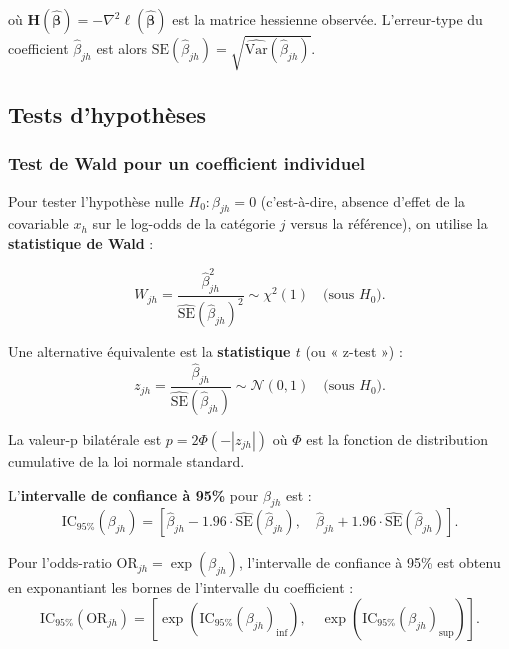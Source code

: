 \documentclass[12pt,a4paper]{article}
\begin{document}
où $\mathbf{H}(\widehat{\boldsymbol{\beta}}) = -\nabla^2 \ell(\widehat{\boldsymbol{\beta}})$ est la matrice hessienne observée. L'erreur-type du coefficient $\widehat{\beta}_{jh}$ est alors $\text{SE}(\widehat{\beta}_{jh}) = \sqrt{\widehat{\text{Var}}(\widehat{\beta}_{jh})}$.

\subsection{Tests d'hypothèses}

\subsubsection{Test de Wald pour un coefficient individuel}

Pour tester l'hypothèse nulle $H_0 : \beta_{jh} = 0$ (c'est-à-dire, absence d'effet de la covariable $x_h$ sur le log-odds de la catégorie $j$ versus la référence), on utilise la \textbf{statistique de Wald} :

\begin{equation}\label{eq:wald}
W_{jh} = \frac{\widehat{\beta}_{jh}^2}{\widehat{\text{SE}}(\widehat{\beta}_{jh})^2} \sim \chi^2(1) \quad \text{(sous } H_0 \text{)}.
\end{equation}

Une alternative équivalente est la \textbf{statistique $t$} (ou « z-test ») :
\begin{equation}
z_{jh} = \frac{\widehat{\beta}_{jh}}{\widehat{\text{SE}}(\widehat{\beta}_{jh})} \sim \mathcal{N}(0, 1) \quad \text{(sous } H_0 \text{)}.
\end{equation}

La valeur-p bilatérale est $p = 2 \Phi(-|z_{jh}|)$ où $\Phi$ est la fonction de distribution cumulative de la loi normale standard.

L'\textbf{intervalle de confiance à 95\%} pour $\beta_{jh}$ est :
\begin{equation}
\text{IC}_{95\%}(\beta_{jh}) = \left[ \widehat{\beta}_{jh} - 1.96 \cdot \widehat{\text{SE}}(\widehat{\beta}_{jh}), \quad \widehat{\beta}_{jh} + 1.96 \cdot \widehat{\text{SE}}(\widehat{\beta}_{jh}) \right].
\end{equation}

Pour l'odds-ratio $\text{OR}_{jh} = \exp(\beta_{jh})$, l'intervalle de confiance à 95\% est obtenu en exponantiant les bornes de l'intervalle du coefficient :
\begin{equation}
\text{IC}_{95\%}(\text{OR}_{jh}) = \left[ \exp(\text{IC}_{95\%}(\beta_{jh})_{\text{inf}}), \quad \exp(\text{IC}_{95\%}(\beta_{jh})_{\text{sup}}) \right].
\end{equation}
\end{document}
